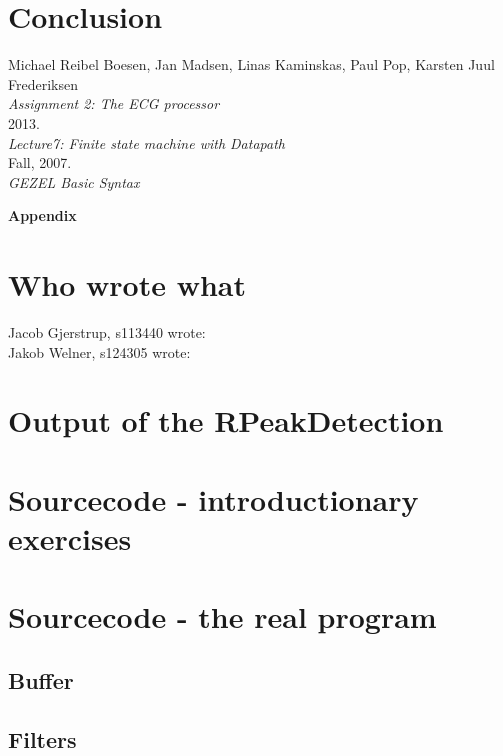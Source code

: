 \documentclass[12pt,a4paper]{article}
\begin{document}
\section{Conclusion}
\newpage
\begin{thebibliography}{9}

  Michael Reibel Boesen, Jan Madsen, Linas Kaminskas, Paul Pop, Karsten Juul Frederiksen\\
  \emph{Assignment 2: The ECG processor}\\
  2013.\\

  \emph{Lecture7: Finite state machine with Datapath}\\
  Fall, 2007.\\

  \emph{GEZEL Basic Syntax}\\
\end{thebibliography}
	
\newpage	
	\begin{Large}
		\textbf{Appendix}
	\end{Large}
	\appendix

\section{Who wrote what}
Jacob Gjerstrup, s113440 wrote: \\
Jakob Welner, s124305 wrote: \\

\section{Output of the RPeakDetection}
	
\section{Sourcecode - introductionary exercises}
	
\section{Sourcecode - the real program}

\subsection{Buffer}
\subsection{Filters}
\end{document}
